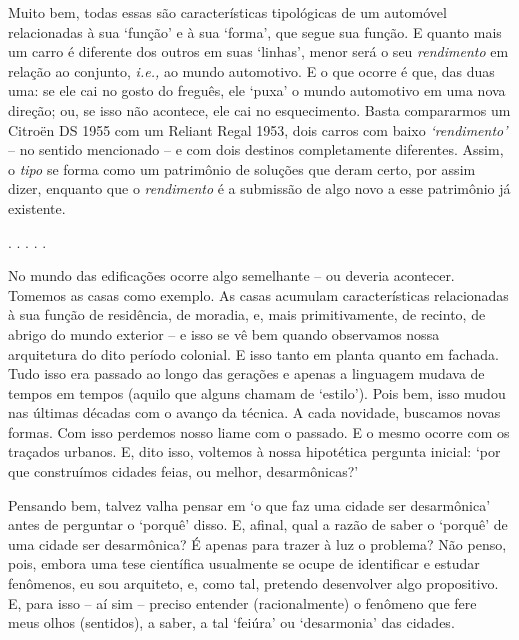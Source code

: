 \documentclass[12pt, a4paper]{book} %
\begin{document}
            Muito bem, todas essas são características tipológicas de um automóvel relacionadas à sua `função' e à sua `forma', que segue sua função. E quanto mais um carro é diferente dos outros em suas `linhas', menor será o seu \textit{rendimento} em relação ao conjunto, \textit{i.e.,} ao mundo automotivo. E o que ocorre é que, das duas uma: se ele cai no gosto do freguês, ele `puxa' o mundo automotivo em uma nova direção; ou, se isso não acontece, ele cai no esquecimento. Basta compararmos um Citroën DS 1955 com um Reliant Regal 1953, dois carros com baixo \textit{`rendimento'} – no sentido mencionado – e com dois destinos completamente diferentes. Assim, o \textit{tipo} se forma como um patrimônio de soluções que deram certo, por assim dizer, enquanto que o \textit{rendimento} é a submissão de algo novo a esse patrimônio já existente.
	
	        \begin{center}
		    . . . . .
	        \end{center}

            No mundo das edificações ocorre algo semelhante – ou deveria acontecer. Tomemos as casas como exemplo. As casas acumulam características relacionadas à sua função de residência, de moradia, e, mais primitivamente, de recinto, de abrigo do mundo exterior – e isso se vê bem quando observamos nossa arquitetura do dito período colonial. E isso tanto em planta quanto em fachada. Tudo isso era passado ao longo das gerações e apenas a linguagem mudava de tempos em tempos (aquilo que alguns chamam de `estilo'). Pois bem, isso mudou nas últimas décadas com o avanço da técnica. A cada novidade, buscamos novas formas. Com isso perdemos nosso liame com o passado. E o mesmo ocorre com os traçados urbanos. E, dito isso, voltemos à nossa hipotética pergunta inicial: `por que construímos cidades feias, ou melhor, desarmônicas?' 

            Pensando bem, talvez valha pensar em `o que faz uma cidade ser desarmônica' antes de perguntar o `porquê' disso. E, afinal, qual a razão de saber o `porquê' de uma cidade ser desarmônica? É apenas para trazer à luz o problema? Não penso, pois, embora uma tese científica usualmente se ocupe de identificar e estudar fenômenos, eu sou arquiteto, e, como tal, pretendo desenvolver algo propositivo. E, para isso – aí sim – preciso entender (racionalmente) o fenômeno que fere meus olhos (sentidos), a saber, a tal `feiúra' ou `desarmonia' das cidades. 
	
\end{document}
